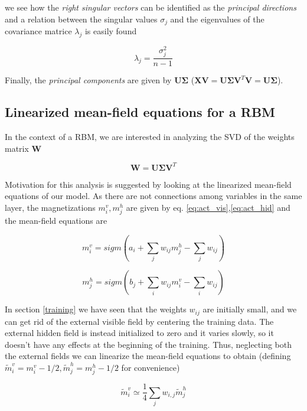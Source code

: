 \documentclass{revtex4-1}
\begin{document}
we see how the \textit{right singular vectors} can be identified as the \textit{principal directions} and a relation between the singular values \(\sigma_j\) and the eigenvalues of the covariance matrice \(\lambda_j\) is easily found

\begin{equation}
\lambda_j = \frac{\sigma_j^2}{n-1}
\label{eq:ls_map}
\end{equation}

Finally, the \textit{principal components} are given by \(\mathbf{U \Sigma}\) (\(\mathbf{XV} = \mathbf{U \Sigma V}^T \mathbf{V} = \mathbf{U \Sigma}\)).

\subsection{Linearized mean-field equations for a RBM}
In the context of a RBM, we are interested in analyzing the SVD of the weights matrix \(\mathbf{W}\)

\begin{equation}
\mathbf{W} = \mathbf{U \Sigma V}^T
\end{equation}

Motivation for this analysis is suggested by looking at the linearized mean-field equations \cite{Nishimori} of our model. As there are not connections among variables in the same layer, the magnetizations \(m_i^v,m_j^h\) are given by eq. \eqref{eq:act_vis},\eqref{eq:act_hid} and the mean-field equations are

\begin{equation}
m_i^v = sigm \left(a_i + \sum_{j} w_{ij} m_j^h - \sum_j w_{ij} \right)
\end{equation}

\begin{equation}
m_j^h = sigm \left(b_j + \sum_i w_{ij} m^v_i - \sum_i w_{ij}\right)
\end{equation}

In section \ref{training} we have seen that the weights \(w_{ij}\) are initially small, and we can get rid of the external visible field by centering the training data. The external hidden field is instead initialized to zero and it varies slowly, so it doesn't have any effects at the beginning of the training. Thus, neglecting both the external fields we can linearize the mean-field equations to obtain (defining \( \tilde{m}_i^v = m_i^v - 1/2, \tilde{m}_j^h = m_j^h - 1/2 \) for convenience)

\begin{equation}
\tilde{m}_i^v \simeq \frac{1}{4} \sum_j w_{i,j} \tilde{m}_j^h
\label{eq:mf_vis}
\end{equation}
\end{document}
